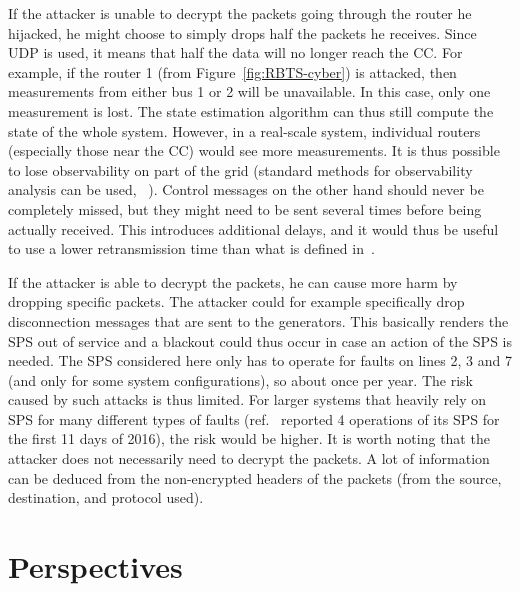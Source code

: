 If the attacker is unable to decrypt the packets going through the router he hijacked, he might choose to simply drops half the packets he receives. Since UDP is used, it means that half the data will no longer reach the CC. For example, if the router 1 (from Figure~\ref{fig:RBTS-cyber}) is attacked, then measurements from either bus 1 or 2 will be unavailable. In this case, only one measurement is lost. The state estimation algorithm can thus still compute the state of the whole system. However, in a real-scale system, individual routers (especially those near the CC) would see more measurements. It is thus possible to lose observability on part of the grid (standard methods for observability analysis can be used, \eg~\cite{SEbook}). Control messages on the other hand should never be completely missed, but they might need to be sent several times before being actually received. This introduces additional delays, and it would thus be useful to use a lower retransmission time than what is defined in~\cite{roundTripTime}.

If the attacker is able to decrypt the packets, he can cause more harm by dropping specific packets. The attacker could for example specifically drop disconnection messages that are sent to the generators. This basically renders the SPS out of service and a blackout could thus occur in case an action of the SPS is needed. The SPS considered here only has to operate for faults on lines 2, 3 and 7 (and only for some system configurations), so about once per year. The risk caused by such attacks is thus limited. For larger systems that heavily rely on SPS for many different types of faults (\eg ref.~\cite{GeorgiaSPS} reported 4 operations of its SPS for the first 11 days of 2016), the risk would be higher. It is worth noting that the attacker does not necessarily need to decrypt the packets. A lot of information can be deduced from the non-encrypted headers of the packets (\eg from the source, destination, and protocol used).

\section{Perspectives}
\label{sec:SPSperspectives}


